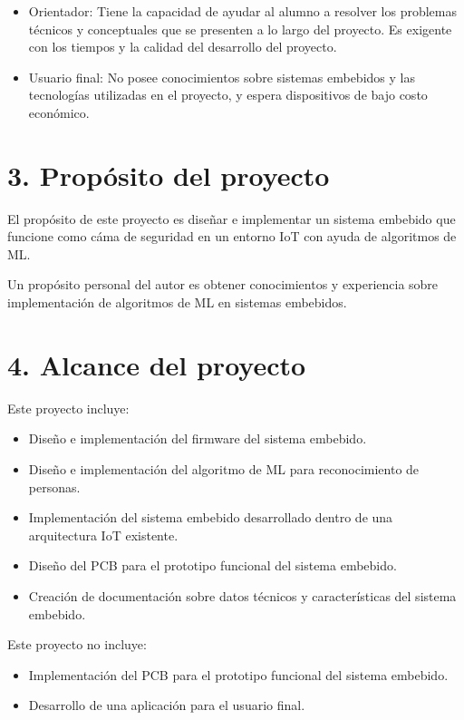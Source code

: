 \documentclass[
11pt, %
codirector, %
]{plan}
\begin{document}
\begin{itemize}
	\item Orientador: Tiene la capacidad de ayudar al alumno a resolver los problemas técnicos y conceptuales que se presenten a lo largo del proyecto. Es exigente con los tiempos y la calidad del desarrollo del proyecto.
	\item Usuario final: No posee conocimientos sobre sistemas embebidos y las tecnologías utilizadas en el proyecto, y espera dispositivos de bajo costo económico.
\end{itemize}



\section{3. Propósito del proyecto}
\label{sec:proposito}

El propósito de este proyecto es diseñar e implementar un sistema embebido que funcione como cáma de seguridad en un entorno IoT con ayuda de algoritmos de ML. 

Un propósito personal del autor es obtener conocimientos y experiencia sobre implementación de algoritmos de ML en sistemas embebidos.

\section{4. Alcance del proyecto}
\label{sec:alcance}

Este proyecto incluye:
\begin{itemize}
	\item Diseño e implementación del firmware del sistema embebido.
	\item Diseño e implementación del algoritmo de ML para reconocimiento de personas.
	\item Implementación del sistema embebido desarrollado dentro de una arquitectura IoT existente.
	\item Diseño del PCB para el prototipo funcional del sistema embebido.
	\item Creación de documentación sobre datos técnicos y características del sistema embebido.
\end{itemize}

Este proyecto no incluye:
\begin{itemize}
	\item Implementación del PCB para el prototipo funcional del sistema embebido.
	\item Desarrollo de una aplicación para el usuario final.
\end{itemize}
\end{document}
